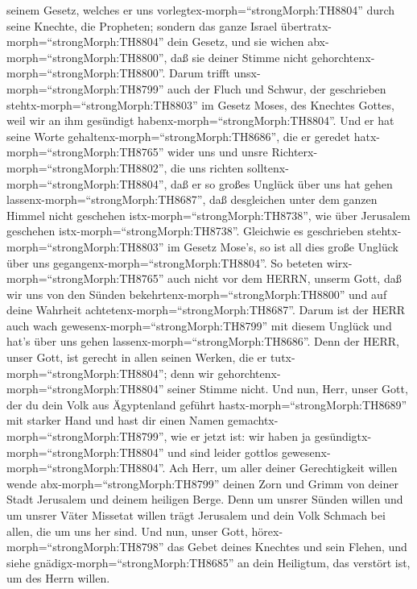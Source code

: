 seinem Gesetz, welches er uns vorlegtex-morph=``strongMorph:TH8804''
durch seine Knechte, die Propheten;  sondern das ganze
Israel übertratx-morph=``strongMorph:TH8804'' dein Gesetz, und sie
wichen abx-morph=``strongMorph:TH8800'', daß sie deiner Stimme nicht
gehorchtenx-morph=``strongMorph:TH8800''. Darum trifft
unsx-morph=``strongMorph:TH8799'' auch der Fluch und Schwur, der
geschrieben stehtx-morph=``strongMorph:TH8803'' im Gesetz Moses, des
Knechtes Gottes, weil wir an ihm gesündigt
habenx-morph=``strongMorph:TH8804''.  Und er hat seine
Worte gehaltenx-morph=``strongMorph:TH8686'', die er geredet
hatx-morph=``strongMorph:TH8765'' wider uns und unsre
Richterx-morph=``strongMorph:TH8802'', die uns richten
solltenx-morph=``strongMorph:TH8804'', daß er so großes Unglück über uns
hat gehen lassenx-morph=``strongMorph:TH8687'', daß desgleichen unter
dem ganzen Himmel nicht geschehen istx-morph=``strongMorph:TH8738'', wie
über Jerusalem geschehen istx-morph=``strongMorph:TH8738''.
 Gleichwie es geschrieben
stehtx-morph=``strongMorph:TH8803'' im Gesetz Mose's, so ist all dies
große Unglück über uns gegangenx-morph=``strongMorph:TH8804''. So
beteten wirx-morph=``strongMorph:TH8765'' auch nicht vor dem HERRN,
unserm Gott, daß wir uns von den Sünden
bekehrtenx-morph=``strongMorph:TH8800'' und auf deine Wahrheit
achtetenx-morph=``strongMorph:TH8687''.  Darum ist der HERR
auch wach gewesenx-morph=``strongMorph:TH8799'' mit diesem Unglück und
hat's über uns gehen lassenx-morph=``strongMorph:TH8686''. Denn der
HERR, unser Gott, ist gerecht in allen seinen Werken, die er
tutx-morph=``strongMorph:TH8804''; denn wir
gehorchtenx-morph=``strongMorph:TH8804'' seiner Stimme nicht.
 Und nun, Herr, unser Gott, der du dein Volk aus
Ägyptenland geführt hastx-morph=``strongMorph:TH8689'' mit starker Hand
und hast dir einen Namen gemachtx-morph=``strongMorph:TH8799'', wie er
jetzt ist: wir haben ja gesündigtx-morph=``strongMorph:TH8804'' und sind
leider gottlos gewesenx-morph=``strongMorph:TH8804''.  Ach
Herr, um aller deiner Gerechtigkeit willen wende
abx-morph=``strongMorph:TH8799'' deinen Zorn und Grimm von deiner Stadt
Jerusalem und deinem heiligen Berge. Denn um unsrer Sünden willen und um
unsrer Väter Missetat willen trägt Jerusalem und dein Volk Schmach bei
allen, die um uns her sind.  Und nun, unser Gott,
hörex-morph=``strongMorph:TH8798'' das Gebet deines Knechtes und sein
Flehen, und siehe gnädigx-morph=``strongMorph:TH8685'' an dein
Heiligtum, das verstört ist, um des Herrn willen. 

